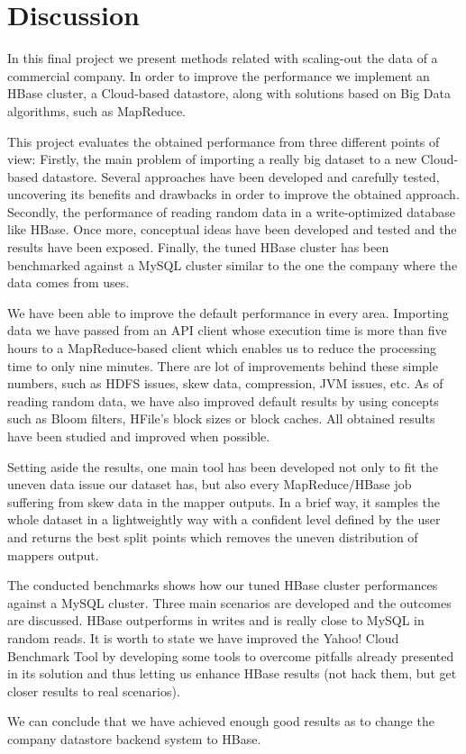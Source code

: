 \section{Discussion}

In this final project we present methods related with scaling-out the data of a commercial company. In order to improve the performance we implement an HBase cluster, a Cloud-based datastore, along with solutions based on Big Data algorithms, such as MapReduce.
\par
This project evaluates the obtained performance from three different points of view: Firstly, the main problem of importing a really big dataset to a new Cloud-based datastore. Several approaches have been developed and carefully tested, uncovering its benefits and drawbacks in order to improve the obtained approach. Secondly,  the performance of reading random data in a write-optimized database like HBase. Once more, conceptual ideas have been developed and tested and the results have been exposed. Finally, the tuned HBase cluster has been benchmarked against a MySQL cluster similar to the one the company where the data comes from uses.
\par
We have been able to improve the default performance in every area. Importing data we have passed from an API client whose execution time is more than five hours to a MapReduce-based client which enables us to reduce the processing time to only nine minutes. There are lot of improvements behind these simple numbers, such as HDFS issues, skew data, compression, JVM issues, etc. As of reading random data, we have also improved default results by using concepts such as Bloom filters, HFile's block sizes or block caches. All obtained results have been studied and improved when possible.
\par
Setting aside the results, one main tool has been developed not only to fit the uneven data issue our dataset has, but also every MapReduce/HBase job suffering from skew data in the mapper outputs. In a brief way, it samples the whole dataset in a lightweightly way with a confident level defined by the user and returns the best split points which removes the uneven distribution of mappers output.  
\par
The conducted benchmarks shows how our tuned HBase cluster performances against a MySQL cluster. Three main scenarios are developed and the outcomes are discussed. HBase outperforms in writes and is really close to MySQL in random reads. It is worth to state we have improved the Yahoo! Cloud Benchmark Tool by developing some tools to overcome pitfalls already presented in its solution and thus letting us enhance HBase results (not hack them, but get closer results to real scenarios).
\par
We can conclude that we have achieved enough good results as to change the company datastore backend system to HBase.

